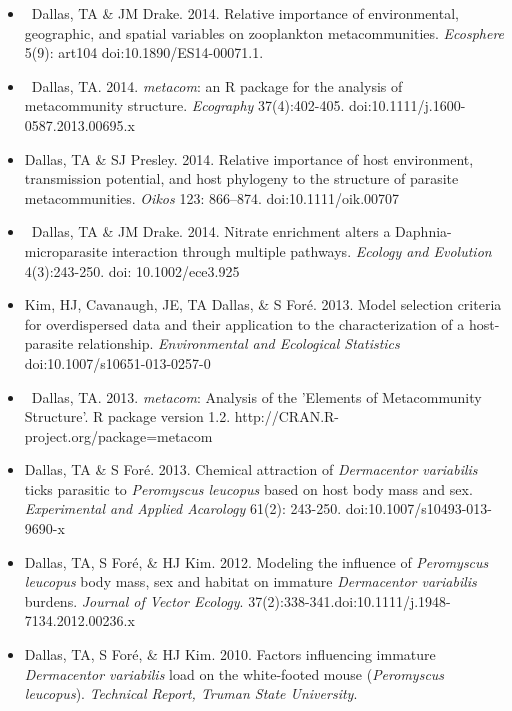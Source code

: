 \documentclass[]{CV}
\begin{document}
\begin{itemize}

\item \OA \ {\mefont Dallas, TA} \& JM Drake. 2014. Relative importance of environmental, geographic, and spatial variables on zooplankton metacommunities. \textit{Ecosphere} 5(9): art104 doi:10.1890/ES14-00071.1.

\item \OA \ {\mefont Dallas, TA}. 2014. \textit{metacom}: an R package for the analysis of metacommunity structure. \textit{Ecography} 37(4):402-405. doi:10.1111/j.1600-0587.2013.00695.x

\item {\mefont Dallas, TA} \& SJ Presley. 2014. Relative importance of host environment, transmission potential, and host phylogeny to the structure of parasite metacommunities. \textit{Oikos} 123: 866–874. doi:10.1111/oik.00707

\item \OA \ {\mefont Dallas, TA} \& JM Drake. 2014. Nitrate enrichment alters a Daphnia-microparasite interaction through multiple pathways. \textit{Ecology and Evolution} 4(3):243-250. doi: 10.1002/ece3.925

\item Kim, HJ, Cavanaugh, JE, {\mefont TA Dallas}, \& S For\'e. 2013. Model selection criteria for overdispersed data and their application to the characterization of a host-parasite relationship. \textit{Environmental and Ecological Statistics} doi:10.1007/s10651-013-0257-0

\item \OA \ {\mefont Dallas, TA}. 2013. \textit{metacom}: Analysis of the 'Elements of Metacommunity Structure'. R package version 1.2. http://CRAN.R-project.org/package=metacom

\item {\mefont Dallas, TA} \& S For\'e. 2013. Chemical attraction of \textit{Dermacentor variabilis} ticks parasitic to \textit{Peromyscus leucopus} based on host body mass and sex. \textit{Experimental and Applied Acarology} 61(2): 243-250. doi:10.1007/s10493-013-9690-x

\item {\mefont Dallas, TA}, S For\'e, \& HJ Kim. 2012. Modeling the influence of \textit{Peromyscus leucopus} body mass, sex and habitat on immature \textit{Dermacentor variabilis} burdens. \textit{Journal of Vector Ecology}. 37(2):338-341.doi:10.1111/j.1948-7134.2012.00236.x

\item {\mefont Dallas, TA}, S For\'e, \& HJ Kim. 2010. Factors influencing immature \textit{Dermacentor variabilis} load on the white-footed mouse (\textit{Peromyscus leucopus}). \textit{Technical Report, Truman State University}.
\end{itemize}
\end{document}
